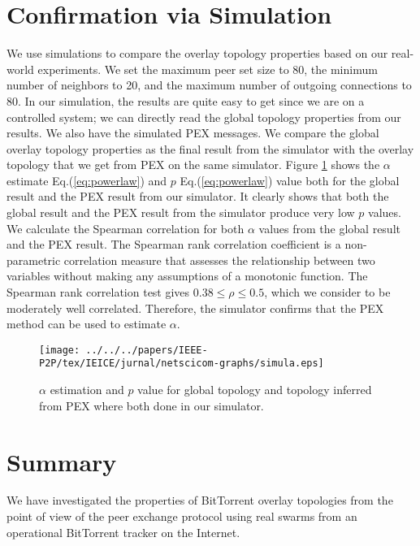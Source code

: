 \section{Confirmation via Simulation}\label{simulation}
We use simulations to compare the overlay topology properties based  on our real-world experiments. 
We set the maximum peer set size to 80, the minimum number of neighbors to 20, and the maximum number of outgoing connections to 80. 
In our simulation, the results are quite easy to get since we are on a controlled system;  we can directly read the  global topology properties from our results. 
We also have the simulated PEX messages. We compare the global overlay topology properties as the final result from the simulator with the overlay topology that we get from PEX on the same simulator.
Figure \ref{fig:simulation} shows the $\alpha$ estimate Eq.(\ref{eq:powerlaw}) and $p$ Eq.(\ref{eq:powerlaw}) value both for the global result and the PEX result from our simulator. 
It clearly shows that both the global result and the PEX result from the simulator produce very low $p$ values. 
We calculate the Spearman correlation for both $\alpha$ values from the global result and the PEX result. 
The Spearman rank correlation coefficient is a non-parametric correlation measure that assesses the relationship between two variables
without making any assumptions of a monotonic function.
The Spearman rank correlation test gives $0.38 \leq \rho \leq 0.5$, which we consider to be moderately well correlated. 
Therefore, the simulator confirms that the PEX method can be used to estimate $\alpha$.
\begin{figure}[!tb]
\begin{center}
\texttt{[image: ../../../papers/IEEE-P2P/tex/IEICE/jurnal/netscicom-graphs/simula.eps]}
\end{center}
\caption{$\alpha$ estimation and $p$ value for global topology and topology inferred from PEX where both done in our simulator.}
\label{fig:simulation}
\end{figure}


\section{Summary}\label{summary3}
We have investigated the properties of BitTorrent overlay topologies from the point of view of the peer exchange protocol using real swarms from an operational BitTorrent tracker on the Internet. 

